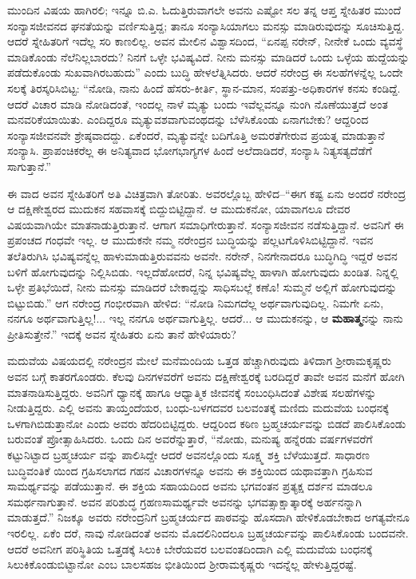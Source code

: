 ಮುಂದಿನ ವಿಷಯ ಹಾಗಿರಲಿ; ಇನ್ನೂ ಬಿ.ಎ. ಓದುತ್ತಿರುವಾಗಲೇ ಅವನು ಎಷ್ಟೋ ಸಲ ತನ್ನ ಆಪ್ತ ಸ್ನೇಹಿತರ ಮುಂದೆ ಸಂನ್ಯಾಸಜೀವನದ ಘನತೆಯನ್ನು ವರ್ಣಿಸುತ್ತಿದ್ದ; ತಾನೂ ಸಂನ್ಯಾಸಿಯಾಗಲು ಮನಸ್ಸು ಮಾಡಿರುವುದನ್ನು ಸೂಚಿಸುತ್ತಿದ್ದ. ಆದರೆ ಸ್ನೇಹಿತರಿಗೆ ಇದೆಲ್ಲ ಸರಿ ಕಾಣಲಿಲ್ಲ. ಅವನ ಮೇಲಿನ ವಿಶ್ವಾಸದಿಂದ, “ಏನಪ್ಪ ನರೇನ್, ನೀನೇಕೆ ಒಂದು ವ್ಯವಸ್ಥೆ ಮಾಡಿಕೊಂಡು ನೆಲೆನಿಲ್ಲಬಾರದು? ನಿನಗೆ ಒಳ್ಳೇ ಭವಿಷ್ಯವಿದೆ. ನೀನು ಮನಸ್ಸು ಮಾಡಿದರೆ ಒಂದು ಒಳ್ಳೆಯ ಹುದ್ದೆಯನ್ನು ಪಡೆದುಕೊಂಡು ಸುಖವಾಗಿರಬಹುದು” ಎಂದು ಬುದ್ಧಿ ಹೇಳಲೆತ್ನಿಸಿದರು. ಆದರೆ ನರೇಂದ್ರ ಈ ಸಲಹೆಗಳನ್ನೆಲ್ಲ ಒಂದೇ ಸಲಕ್ಕೆ ತಿರಸ್ಕರಿಸಿಬಿಟ್ಟ: “ನೋಡಿ, ನಾನು ಹಿಂದೆ ಹೆಸರು-ಕೀರ್ತಿ, ಸ್ಥಾನ-ಮಾನ, ಸಂಪತ್ತು-ಅಧಿಕಾರಗಳ ಕನಸು ಕಂಡಿದ್ದೆ. ಆದರೆ ವಿಚಾರ ಮಾಡಿ ನೋಡಿದಂತೆ, ಇಂದಲ್ಲ ನಾಳೆ ಮೃತ್ಯು ಬಂದು ಇವೆಲ್ಲವನ್ನೂ ನುಂಗಿ ನೊಣೆಯುತ್ತದೆ ಅಂತ ಮನವರಿಕೆಯಾಯಿತು. ಎಂದಿದ್ದರೂ ಮೃತ್ಯುವಶವಾಗುವಂಥದನ್ನು ಬೆಳೆಸಿಕೊಂಡು ಏನಾಗಬೇಕು? ಆದ್ದರಿಂದ ಸಂನ್ಯಾಸಜೀವನವೇ ಶ್ರೇಷ್ಠವಾದದ್ದು. ಏಕೆಂದರೆ, ಮೃತ್ಯುವನ್ನೇ ಬದಿಗೊತ್ತಿ ಅಮರತೆಗೇರುವ ಪ್ರಯತ್ನ ಮಾಡುತ್ತಾನೆ ಸಂನ್ಯಾಸಿ. ಪ್ರಾಪಂಚಿಕರೆಲ್ಲ ಈ ಅನಿತ್ಯವಾದ ಭೋಗಭಾಗ್ಯಗಳ ಹಿಂದೆ ಅಲೆದಾಡಿದರೆ, ಸಂನ್ಯಾಸಿ ನಿತ್ಯಸತ್ಯದೆಡೆಗೆ ಸಾಗುತ್ತಾನೆ.”

ಈ ವಾದ ಅವನ ಸ್ನೇಹಿತರಿಗೆ ಅತಿ ವಿಚಿತ್ರವಾಗಿ ತೋರಿತು. ಅವರಲ್ಲೊಬ್ಬ ಹೇಳಿದ–“ಈಗ ಕಷ್ಟ ಏನು ಅಂದರೆ ನರೇಂದ್ರ ಆ ದಕ್ಷಿಣೇಶ್ವರದ ಮುದುಕನ ಸಹವಾಸಕ್ಕೆ ಬಿದ್ದುಬಿಟ್ಟಿದ್ದಾನೆ. ಆ ಮುದುಕನೋ, ಯಾವಾಗಲೂ ದೇವರ ವಿಷಯವಾಗಿಯೇ ಮಾತನಾಡುತ್ತಿರುತ್ತಾನೆ. ಆಗಾಗ ಸಮಾಧಿಗೇರುತ್ತಾನೆ. ಸಂನ್ಯಾಸಜೀವನ ನಡೆಸುತ್ತಿದ್ದಾನೆ. ಅವನಿಗೆ ಈ ಪ್ರಪಂಚದ ಗಂಧವೇ ಇಲ್ಲ. ಆ ಮುದುಕನೇ ನಮ್ಮ ನರೇಂದ್ರನ ಬುದ್ಧಿಯನ್ನು ಪಲ್ಲಟಗೊಳಿಸಿಬಿಟ್ಟಿದ್ದಾನೆ. ಇವನ ತಲೆತಿರುಗಿಸಿ ಭವಿಷ್ಯವನ್ನೆಲ್ಲ ಹಾಳುಮಾಡುತ್ತಿರುವವನು ಅವನೇ. ನರೇನ್, ನಿನಗೇನಾದರೂ ಬುದ್ಧಿಗಿದ್ಧಿ ಇದ್ದರೆ ಅವನ ಬಳಿಗೆ ಹೋಗುವುದನ್ನು ನಿಲ್ಲಿಸಿಬಿಡು. ಇಲ್ಲದೆಹೋದರೆ, ನಿನ್ನ ಭವಿಷ್ಯವೆಲ್ಲ ಹಾಳಾಗಿ ಹೋಗುವುದು ಖಂಡಿತ. ನಿನ್ನಲ್ಲಿ ಒಳ್ಳೇ ಪ್ರತಿಭೆಯಿದೆ, ನೀನು ಮನಸ್ಸು ಮಾಡಿದರೆ ಬೇಕಾದ್ದನ್ನು ಸಾಧಿಸಬಲ್ಲೆ ಕಣೊ! ಸುಮ್ಮನೆ ಅಲ್ಲಿಗೆ ಹೋಗುವುದನ್ನು ಬಿಟ್ಟುಬಿಡು.” ಆಗ ನರೇಂದ್ರ ಗಂಭೀರವಾಗಿ ಹೇಳಿದ: “ನೋಡಿ ನಿಮಗದೆಲ್ಲ ಅರ್ಥವಾಗುವುದಿಲ್ಲ. ನಿಮಗೇ ಏನು, ನನಗೂ ಅರ್ಥವಾಗುತ್ತಿಲ್ಲ!... ಇಲ್ಲ ನನಗೂ ಅರ್ಥವಾಗುತ್ತಿಲ್ಲ. ಆದರೆ... ಆ ಮುದುಕನನ್ನು, ಆ \textbf{ಮಹಾತ್ಮ}ನನ್ನು ನಾನು ಪ್ರೀತಿಸುತ್ತೇನೆ.” ಇದಕ್ಕೆ ಅವನ ಸ್ನೇಹಿತರು ಏನು ತಾನೆ ಹೇಳಿಯಾರು?

ಮದುವೆಯ ವಿಷಯದಲ್ಲಿ ನರೇಂದ್ರನ ಮೇಲೆ ಮನೆಮಂದಿಯ ಒತ್ತಡ ಹೆಚ್ಚಾಗಿರುವುದು ತಿಳಿದಾಗ ಶ್ರೀರಾಮಕೃಷ್ಣರು ಅವನ ಬಗ್ಗೆ ಕಾತರಗೊಂಡರು. ಕೆಲವು ದಿನಗಳವರೆಗೆ ಅವನು ದಕ್ಷಿಣೇಶ್ವರಕ್ಕೆ ಬರದಿದ್ದರೆ ತಾವೇ ಅವನ ಮನೆಗೆ ಹೋಗಿ ಮಾತನಾಡಿಸುತ್ತಿದ್ದರು. ಅವನಿಗೆ ಧ್ಯಾನಕ್ಕೆ ಹಾಗೂ ಆಧ್ಯಾತ್ಮಿಕ ಜೀವನಕ್ಕೆ ಸಂಬಂಧಿಸಿದಂತೆ ವಿಶೇಷ ಸಲಹೆಗಳನ್ನು ನೀಡುತ್ತಿದ್ದರು. ಎಲ್ಲಿ ಅವನು ತಾಯ್ತಂದೆಯರ, ಬಂಧು-ಬಳಗದವರ ಬಲವಂತಕ್ಕೆ ಮಣಿದು ಮದುವೆಯ ಬಂಧನಕ್ಕೆ ಒಳಗಾಗಿಬಿಡುತ್ತಾನೋ ಎಂದು ಅವರು ಹೆದರಿಬಿಟ್ಟಿದ್ದರು. ಆದ್ದರಿಂದ ಕಠಿಣ ಬ್ರಹ್ಮಚರ್ಯವನ್ನು ಬಿಡದೆ ಪಾಲಿಸಿಕೊಂಡು ಬರುವಂತೆ ಪ್ರೋತ್ಸಾಹಿಸಿದರು. ಒಂದು ದಿನ ಅವರೆನ್ನುತ್ತಾರೆ, “ನೋಡು, ಮನುಷ್ಯ ಹನ್ನೆರಡು ವರ್ಷಗಳವರೆಗೆ ಕಟ್ಟುನಿಟ್ಟಾದ ಬ್ರಹ್ಮಚರ್ಯ ವನ್ನು ಪಾಲಿಸಿದ್ದೇ ಆದರೆ ಅವನಲ್ಲೊಂದು ಸೂಕ್ಷ್ಮ ಶಕ್ತಿ ಬೆಳೆಯುತ್ತದೆ. ಸಾಧಾರಣ ಬುದ್ಧಿವಂತಿಕೆ ಯಿಂದ ಗ್ರಹಿಸಲಾಗದ ಗಹನ ವಿಚಾರಗಳನ್ನೂ ಅವನು ಈ ಶಕ್ತಿಯಿಂದ ಯಥಾವತ್ತಾಗಿ ಗ್ರಹಿಸುವ ಸಾಮರ್ಥ್ಯವನ್ನು ಪಡೆಯುತ್ತಾನೆ. ಈ ಶಕ್ತಿಯ ಸಹಾಯದಿಂದ ಅವನು ಭಗವಂತನ ಪ್ರತ್ಯಕ್ಷ ದರ್ಶನ ಮಾಡಲೂ ಸಮರ್ಥನಾಗುತ್ತಾನೆ. ಅವನ ಪರಿಶುದ್ಧ ಗ್ರಹಣಸಾಮರ್ಥ್ಯವೇ ಅವನನ್ನು ಭಗವತ್ಸಾಕ್ಷಾತ್ಕಾರಕ್ಕೆ ಅರ್ಹನನ್ನಾಗಿ ಮಾಡುತ್ತದೆ.” ನಿಜಕ್ಕೂ ಅವರು ನರೇಂದ್ರನಿಗೆ ಬ್ರಹ್ಮಚರ್ಯದ ಪಾಠವನ್ನು ಹೊಸದಾಗಿ ಹೇಳಿಕೊಡಬೇಕಾದ ಅಗತ್ಯವೇನೂ ಇರಲಿಲ್ಲ. ಏಕೆಂ ದರೆ, ನಾವು ನೋಡಿದಂತೆ ಅವನು ಮೊದಲಿನಿಂದಲೂ ಬ್ರಹ್ಮಚರ್ಯವನ್ನು ಪಾಲಿಸಿಕೊಂಡು ಬಂದವನೇ. ಆದರೆ ಅವನೀಗ ಪರಿಸ್ಥಿತಿಯ ಒತ್ತಡಕ್ಕೆ ಸಿಲುಕಿ ಬೇರೆಯವರ ಬಲವಂತದಿಂದಾಗಿ ಎಲ್ಲಿ ಮದುವೆಯ ಬಂಧನಕ್ಕೆ ಸಿಲುಕಿಕೊಂಡುಬಿಟ್ಟಾನೋ ಎಂಬ ಬಾಲಸಹಜ ಭೀತಿಯಿಂದ ಶ್ರೀರಾಮಕೃಷ್ಣರು ಇದನ್ನೆಲ್ಲ ಹೇಳುತ್ತಿದ್ದರಷ್ಟೆ.

